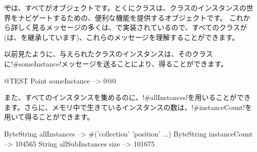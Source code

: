 \documentclass[a4paper,10pt,twoside]{book}
\begin{document}
\st では、すべてがオブジェクトです。とくにクラスは、クラスのインスタンスの世界をナビゲートするための、便利な機能を提供するオブジェクトです。%
これから詳しく見るメッセージの多くは、で実装されているので、すべてのクラスが(は、を継承しています)、これらのメッセージを理解することができます。

以前見たように、与えられたクラスのインスタンスは、そのクラスに\ct!#someInstance!メッセージを送ることにより、得ることができます。%
\begin{code}{@TEST} %
Point someInstance --> 0@0
\end{code}

また、すべてのインスタンスを集めるのに、\ct!#allInstances!を用いることができます。さらに、メモリ中で生きているインスタンスの数は、\ct!#instanceCount!を用いて得ることができます。

\begin{code}{} %
ByteString allInstances        --> #('collection' 'position'  ...)
ByteString instanceCount    --> 104565
String allSubInstances size -->  101675
\end{code}
\end{document}
